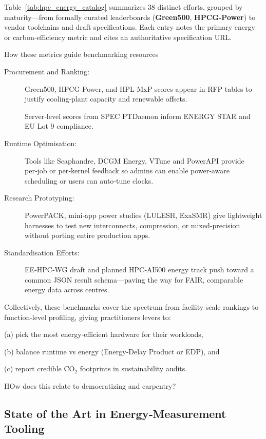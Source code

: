 
Table~\ref{tab:hpc_energy_catalog} summarizes 38 distinct efforts, grouped by maturity—from formally curated leaderboards (\textbf{Green500}, \textbf{HPCG‑Power}) to vendor toolchains and draft specifications.  Each entry notes the primary energy or carbon‑efficiency metric and cites an authoritative specification URL.

How these metrics guide benchmarking resources 

\begin{description}
\item[Procurement and Ranking:]

Green500, HPCG‑Power, and HPL‑MxP scores appear in RFP tables to justify cooling‑plant capacity and renewable offsets.

Server‑level scores from SPEC PTDaemon inform ENERGY STAR and EU Lot 9 compliance.


\item[Runtime Optimisation:]
Tools like Scaphandre, DCGM Energy, VTune and PowerAPI provide per‑job or per‑kernel feedback so admins can enable power‑aware scheduling or users can auto‑tune clocks.

\item[Research Prototyping:]
PowerPACK, mini‑app power studies (LULESH, ExaSMR) give lightweight harnesses to test new interconnects, compression, or mixed‑precision without porting entire production apps.

\item[Standardisation Efforts:]
EE‑HPC‑WG draft and planned HPC‑AI500 energy track push toward a common JSON result schema—paving the way for FAIR, comparable energy data across centres.

\end{description}

Collectively, these benchmarks cover the spectrum from facility‑scale rankings to function‑level profiling, giving practitioners levers to:

(a) pick the most energy‑efficient hardware for their workloads,

(b) balance runtime vs energy (Energy‑Delay Product or EDP), and

(c) report credible CO$_2$ footprints in sustainability audits.

HOw does this relate to democratizing and carpentry?


\subsection{State of the Art in Energy‑Measurement Tooling}
\label{sec:energy:tooling}

